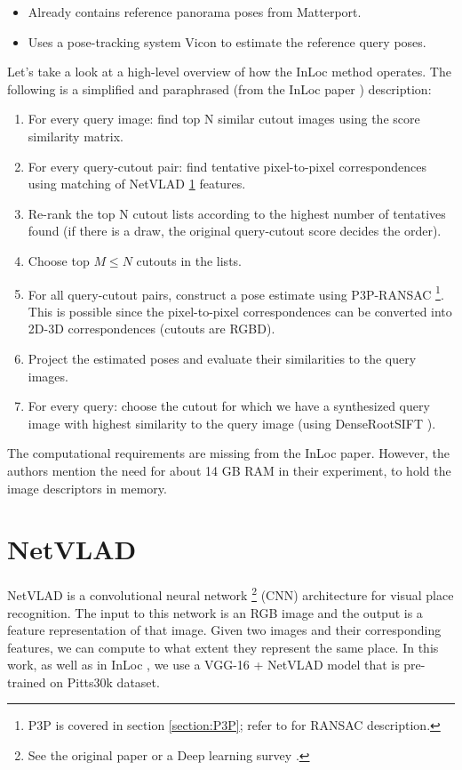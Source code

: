 \documentclass[twoside]{ctuthesis}
\theoremstyle{plain}
\theoremstyle{definition}
\theoremstyle{note}
\begin{document}
\begin{itemize}
	\item Already contains reference panorama poses from Matterport.
	\item Uses a pose-tracking system Vicon to estimate the reference query poses.
\end{itemize}

Let's take a look at a high-level overview of how the InLoc method operates. The following is a simplified and paraphrased (from the InLoc paper \cite{taira2018inloc}) description:

\begin{enumerate}
	\item For every query image: find top N similar cutout images using the score similarity matrix.
	\item For every query-cutout pair: find tentative pixel-to-pixel correspondences using matching of NetVLAD \ref{section:NetVLAD} features.
	\item Re-rank the top N cutout lists according to the highest number of tentatives found (if there is a draw, the original query-cutout score decides the order).
	\item Choose top $M \le N$ cutouts in the lists.
	\item For all query-cutout pairs, construct a pose estimate using P3P-RANSAC \footnote{P3P is covered in section \ref{section:P3P}; refer to \cite{RANSAC} for RANSAC description.}. This is possible since the pixel-to-pixel correspondences can be converted into 2D-3D correspondences (cutouts are RGBD).
	\item Project the estimated poses and evaluate their similarities to the query images.
	\item For every query: choose the cutout for which we have a synthesized query image with highest similarity to the query image (using DenseRootSIFT \cite{RootSIFT} \cite{DenseSIFT}).
\end{enumerate}

The computational requirements are missing from the InLoc paper. However, the authors mention the need for about 14 GB RAM in their experiment, to hold the image descriptors in memory.

\section{NetVLAD}
\label{section:NetVLAD}
NetVLAD \cite{Arandjelovic16} is a convolutional neural network \footnote{See the original paper \cite{CNN} or a Deep learning survey \cite{DeepLearning}.} (CNN) architecture for visual place recognition. The input to this network is an RGB image and the output is a feature representation of that image. Given two images and their corresponding features, we can compute to what extent they represent the same place. In this work, as well as in InLoc \cite{taira2018inloc}, we use a VGG-16 \cite{VGG} + NetVLAD model that is pre-trained on Pitts30k \cite{Arandjelovic16} dataset.
\end{document}
